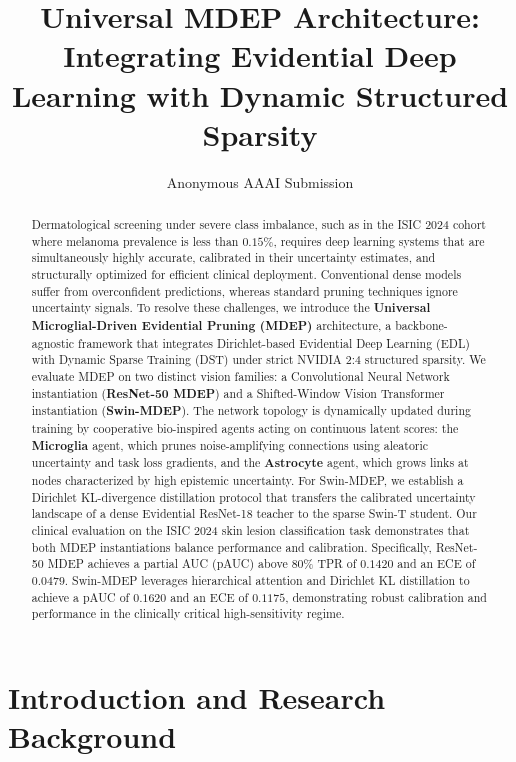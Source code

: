 \documentclass[letterpaper]{article} %
\title{Universal MDEP Architecture: Integrating Evidential Deep Learning with Dynamic Structured Sparsity}
\author{Anonymous AAAI Submission}
\begin{document}
\maketitle

\begin{abstract}
Dermatological screening under severe class imbalance, such as in the ISIC 2024 cohort where melanoma prevalence is less than $0.15\%$, requires deep learning systems that are simultaneously highly accurate, calibrated in their uncertainty estimates, and structurally optimized for efficient clinical deployment. Conventional dense models suffer from overconfident predictions, whereas standard pruning techniques ignore uncertainty signals. To resolve these challenges, we introduce the \textbf{Universal Microglial-Driven Evidential Pruning (MDEP)} architecture, a backbone-agnostic framework that integrates Dirichlet-based Evidential Deep Learning (EDL) with Dynamic Sparse Training (DST) under strict NVIDIA 2:4 structured sparsity. We evaluate MDEP on two distinct vision families: a Convolutional Neural Network instantiation (\textbf{ResNet-50 MDEP}) and a Shifted-Window Vision Transformer instantiation (\textbf{Swin-MDEP}). The network topology is dynamically updated during training by cooperative bio-inspired agents acting on continuous latent scores: the \textbf{Microglia} agent, which prunes noise-amplifying connections using aleatoric uncertainty and task loss gradients, and the \textbf{Astrocyte} agent, which grows links at nodes characterized by high epistemic uncertainty. For Swin-MDEP, we establish a Dirichlet KL-divergence distillation protocol that transfers the calibrated uncertainty landscape of a dense Evidential ResNet-18 teacher to the sparse Swin-T student. Our clinical evaluation on the ISIC 2024 skin lesion classification task demonstrates that both MDEP instantiations balance performance and calibration. Specifically, ResNet-50 MDEP achieves a partial AUC (pAUC) above 80\% TPR of $0.1420$ and an ECE of $0.0479$. Swin-MDEP leverages hierarchical attention and Dirichlet KL distillation to achieve a pAUC of $0.1620$ and an ECE of $0.1175$, demonstrating robust calibration and performance in the clinically critical high-sensitivity regime.
\end{abstract}

\section{Introduction and Research Background}\label{sec:intro}
\end{document}
